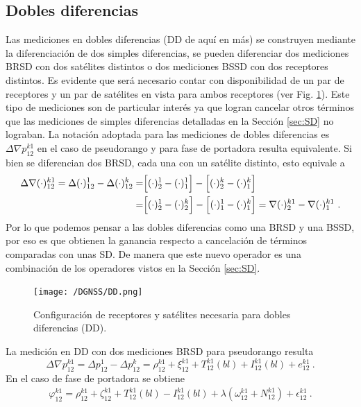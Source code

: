 \documentclass[a4paper,12pt,oneside,onecolumn,final,openright]{book}%
\begin{document}
\subsection{Dobles diferencias}\label{sec:DD}
	Las mediciones en dobles diferencias (DD de aquí en más) se construyen mediante la diferenciación de dos simples diferencias, se pueden diferenciar dos mediciones BRSD con dos satélites distintos o dos mediciones BSSD con dos receptores distintos. Es evidente que será necesario contar con disponibilidad de un par de receptores y un par de satélites en vista para ambos receptores (ver Fig. \ref{fig:DD}). Este tipo de mediciones son de particular interés ya que logran cancelar otros términos que las mediciones de simples diferencias detalladas en la Sección \ref{sec:SD} no lograban. La notación adoptada para las mediciones de dobles diferencias es $\Delta \nabla p_{12}^{k1}$ en el caso de pseudorango y para fase de portadora resulta equivalente. Si bien se diferencian dos BRSD, cada una con un satélite distinto, esto equivale a 
\begin{align}
	\Delta \nabla (\cdot)_{12}^{k1} = \Delta (\cdot)_{12}^1 - \Delta (\cdot)_{12}^k = &\Bigl[ (\cdot)_2^1 - (\cdot)_1^1 \Bigr] - \Bigl[ (\cdot)_2^k - (\cdot)_1^k \Bigr] \\ 
	= & \Bigl[ (\cdot)_2^1 - (\cdot)_2^k \Bigr] - \Bigl[ (\cdot)_1^1 - (\cdot)_1^k \Bigr] = \nabla(\cdot)_2^{k1} - \nabla(\cdot)_1^{k1} \ .  \nonumber
\end{align}
	Por lo que podemos pensar a las dobles diferencias como una BRSD y una BSSD, por eso es que obtienen la ganancia respecto a cancelación de términos comparadas con unas SD. De manera que este nuevo operador es una combinación de los operadores vistos en la Sección \ref{sec:SD}.
\begin{figure}
    \centering
    \texttt{[image: /DGNSS/DD.png]}
    \caption{Configuración de receptores y satélites necesaria para dobles diferencias (DD).}
    \label{fig:DD}
\end{figure}
	La medición en DD con dos mediciones BRSD para pseudorango resulta
\begin{equation}\label{ec:DD_pr}
	\Delta \nabla p_{12}^{k1} = \Delta p_{12}^1 - \Delta p_{12}^k = \rho_{12}^{k1} + \xi_{12}^{k1} + T_{12}^{k1}(bl) + I_{12}^{k1}(bl) + e_{12}^{k1} \ .
\end{equation}
	En el caso de fase de portadora se obtiene
\begin{align}\label{ec:DD_fdp}
	\varphi_{12}^{k1} = \rho_{12}^{k1} + \zeta_{12}^{k1} + T_{12}^{k1}(bl) - I_{12}^{k1}(bl)	+\lambda \left( \omega_{12}^{k1} + N_{12}^{k1}\right) + \epsilon_{12}^{k1} \ .
\end{align}
\end{document}
